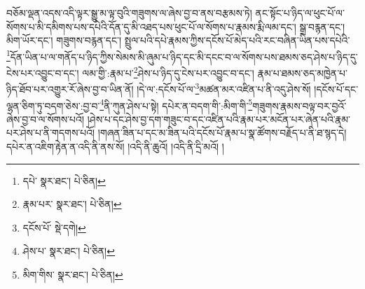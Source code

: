 བཅོམ་ལྡན་འདས་འདི་ལྟར་སྒྱུ་མ་ལྟ་བུའི་གཟུགས་ལ་ཞེས་བྱ་བ་ནས་བརྩམས་ཏེ། ནང་སྟོང་པ་ཉིད་ལ་ཕུང་པོ་ལ་སོགས་པ་མི་དམིགས་པས་དཔེའི་དོན་དུ་མི་འཐད་པས་ཕུང་པོ་ལ་སོགས་པ་རྣམས་རྨི་ལམ་དང་། སྒྲ་བརྙན་དང་། མིག་ཡོར་དང་། གཟུགས་བརྙན་དང་། སྤྲུལ་པའི་དཔེ་རྣམས་ཀྱིས་དངོས་པོ་མེད་པའི་རང་བཞིན་ཡིན་པས་དཔེའི་\footnote{དཔེ་  སྣར་ཐང་།  པེ་ཅིན། }དོན་ཡིན་པ་ལ་གནོད་པ་ཉིད་ཀྱིས་སེམས་མི་ཞུམ་པ་ཉིད་དང་མི་དངང་བ་ལ་སོགས་པས་ཐམས་ཅད་ཤེས་པ་ཉིད་དུ་ངེས་པར་འབྱུང་བ་དང་། ལམ་གྱི་:རྣམ་པ་\footnote{རྣམ་པར་  སྣར་ཐང་།  པེ་ཅིན། }ཤེས་པ་ཉིད་དུ་ངེས་པར་འབྱུང་བ་དང་། རྣམ་པ་ཐམས་ཅད་མཁྱེན་པ་ཉིད་ཐོབ་པར་འགྱུར་རོ་ཞེས་བྱ་བ་ཡིན་ནོ། །དེ་ལ་:དངོས་པོ་ལ་\footnote{དངོས་པོ་  སྡེ་དགེ། }མཚན་མར་འཛིན་པ་ནི་འདུ་ཤེས་སོ། །དངོས་པོ་དང་ལྷན་ཅིག་ཏུ་བདག་ཅེས་:བྱ་བ་\footnote{ཤེས་པ་  སྣར་ཐང་།  པེ་ཅིན། }ནི་ཀུན་ཤེས་པ་སྟེ། དཔེར་ན་བདག་གི་:མིག་གི་\footnote{མིག་གིས་  སྣར་ཐང་།  པེ་ཅིན། }གཟུགས་རྣམས་བལྟ་བར་བྱའོ་ཞེས་བྱ་བ་ལ་སོགས་པའོ། །ཤེས་པ་དང་ཤེས་བྱ་དག་གཟུང་བ་དང་འཛིན་པའི་རྣམ་པར་མངོན་པར་ཞེན་པའི་རྣམ་པར་ཤེས་པ་ནི་གདགས་པའོ། །གཞན་ཟིན་པ་དང་མ་ཟིན་པའི་དངོས་པོ་རྣམ་པ་སྣ་ཚོགས་བརྗོད་པ་ནི་ཐ་སྙད་དེ། དཔེར་ན་འཇིག་རྟེན་ན་འདི་ནི་ནས་སོ། །འདི་ནི་ཆུའོ། །འདི་ནི་དྲི་མའོ། །
